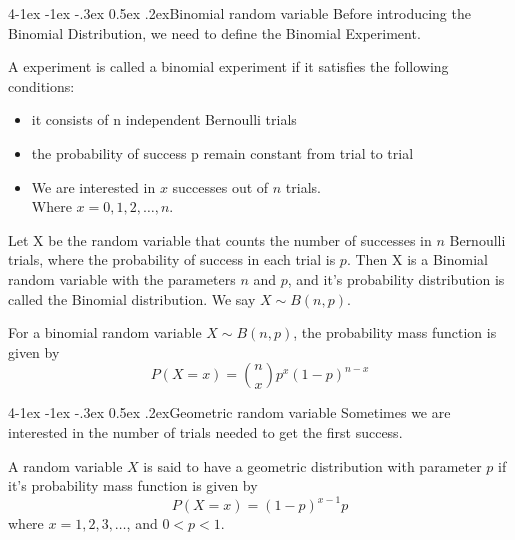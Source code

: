 \documentclass{tufte-handout}
\makeatletter
\renewcommand{\paragraph}{\@startsection{paragraph}%
    {4}{\z@}{-1ex \@plus -1ex \@minus -.3ex}%
    {0.5ex \@plus .2ex}{\normalfont\normalsize\bfseries}}
\makeatother
\begin{document}
\paragraph{Binomial random variable}
Before introducing the Binomial Distribution, we need to define the Binomial Experiment.
\begin{Definition}
    A experiment is called a binomial experiment if it satisfies the following conditions:
    \begin{itemize}
        \item it consists of n independent Bernoulli trials
        \item the probability of success p remain constant from trial to trial
        \item We are interested in \( x \) successes out of \( n \) trials.\\
        Where \( x = 0,1,2,\ldots,n\).
    \end{itemize}
\end{Definition}

\begin{Definition}
    Let X be the random variable that counts the number of successes in \( n \) Bernoulli
    trials, where the probability of success in each trial is \( p \). Then X is a 
    Binomial random variable with the parameters \( n \) and \( p \), and it's probability distribution is called the Binomial distribution.
    We say \( X \sim B(n,p) \).
\end{Definition}

\begin{Theorem}
    For a binomial random variable \( X \sim B(n,p) \), the probability mass function is given by
    \[ P(X = x) = \binom{n}{x} p^x (1-p)^{n-x} \]
\end{Theorem}

\paragraph{Geometric random variable}
Sometimes we are interested in the number of trials needed to get the first success.
\begin{Definition}
    A random variable \( X \) is said to have a geometric distribution with parameter \( p \) if
    it's probability mass function is given by
    \[ P(X = x) = (1-p)^{x-1} p \]
    where \( x = 1,2,3,\ldots \), and \( 0 < p < 1 \).
\end{Definition}
\end{document}
